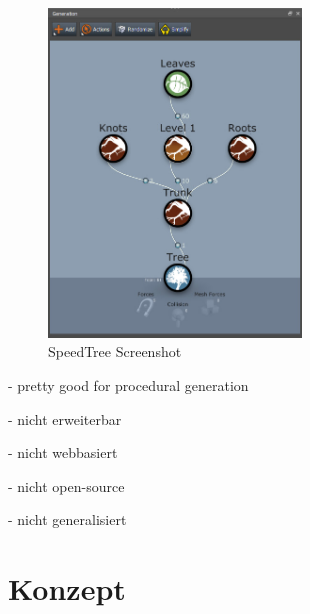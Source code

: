\documentclass[ngerman]{article}
\begin{document}
\begin{figure}[htbp]
  \centering
  \includegraphics[width=0.6\textwidth]{./graphics/generationeditor_7_speedtree.jpg}
  \caption{SpeedTree Screenshot \cite{speedtreeGettingstartedSpeedTree}}
  \label{fig:blender-repeat}
\end{figure}


- pretty good for procedural generation

- nicht erweiterbar

- nicht webbasiert

- nicht open-source

- nicht generalisiert


\section{Konzept}
\end{document}
